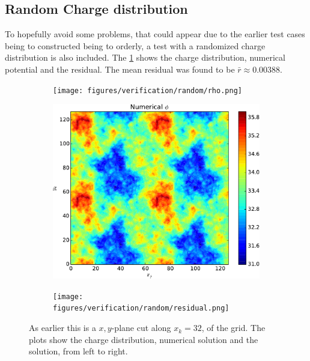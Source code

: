 		\subsection{Random Charge distribution}
			To hopefully avoid some problems, that could appear due to the earlier test
			cases being to constructed being to orderly, a test with a randomized
			charge distribution is also included. The \cref{fig:random} shows the
			charge distribution, numerical potential and the residual. The mean residual was
 			found to be \(\bar{r} \approx 0.00388\).
			\begin{figure}
				\centering
				\begin{subfigure}[b]{0.32\textwidth}
					\texttt{[image: figures/verification/random/rho.png]}
				\end{subfigure}
				\begin{subfigure}[b]{0.32\textwidth}
					\includegraphics[width = \textwidth]{figures/verification/random/numerical.pdf}
				\end{subfigure}
				\begin{subfigure}[b]{0.32\textwidth}
					\texttt{[image: figures/verification/random/residual.png]}
				\end{subfigure}
				\caption{As earlier this is a \(x,y\)-plane cut along \(x_k=32\), of the grid. The plots show the charge distribution,
				numerical solution and the solution, from left to right.}
				\label{fig:random}
			\end{figure}
%
